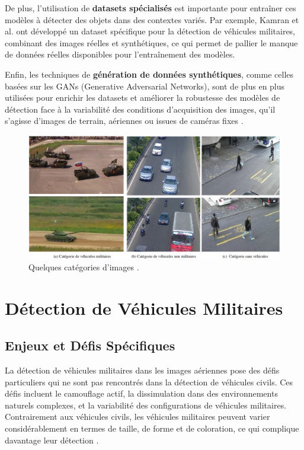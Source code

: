 De plus, l'utilisation de \textbf{datasets spécialisés} est importante pour entraîner ces modèles à détecter des objets dans des contextes variés. Par exemple, Kamran et al. \cite{kamran2020} ont développé un dataset spécifique pour la détection de véhicules militaires, combinant des images réelles et synthétiques, ce qui permet de pallier le manque de données réelles disponibles pour l'entraînement des modèles.

Enfin, les techniques de \textbf{génération de données synthétiques}, comme celles basées sur les GANs (Generative Adversarial Networks), sont de plus en plus utilisées pour enrichir les datasets et améliorer la robustesse des modèles de détection face à la variabilité des conditions d'acquisition des images, qu'il s'agisse d'images de terrain, aériennes ou issues de caméras fixes \cite{spie2020}.

\begin{figure}[H]
    \center
    \includegraphics[width=\textwidth]{./images/category-images.png}
    \caption{Quelques catégories d'images \cite[p.~5]{kamran2020}.}
    \label{fig:comparaison_vehicles}
\end{figure}


\section{Détection de Véhicules Militaires}

\subsection{Enjeux et Défis Spécifiques}

La détection de véhicules militaires dans les images aériennes pose des défis particuliers qui ne sont pas rencontrés dans la détection de véhicules civils. Ces défis incluent le camouflage actif, la dissimulation dans des environnements naturels complexes, et la variabilité des configurations de véhicules militaires. Contrairement aux véhicules civils, les véhicules militaires peuvent varier considérablement en termes de taille, de forme et de coloration, ce qui complique davantage leur détection \cite{kamran2020}.

